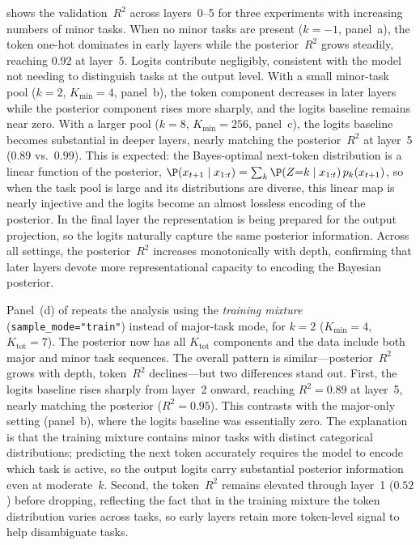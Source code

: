  shows the validation~$R^2$ across layers~0--5 for
three experiments with increasing numbers of minor tasks.
When no minor tasks are present ($k = -1$, panel~a), the token one-hot
dominates in early layers while the posterior~$R^2$ grows steadily, reaching
$0.92$ at layer~5.
Logits contribute negligibly, consistent with the model not needing to
distinguish tasks at the output level.
With a small minor-task pool ($k = 2$, $K_{\mathrm{min}} = 4$, panel~b),
the token component decreases in later layers while the posterior component
rises more sharply, and the logits baseline remains near zero.
With a larger pool ($k = 8$, $K_{\mathrm{min}} = 256$, panel~c), the logits
baseline becomes substantial in deeper layers, nearly matching the
posterior~$R^2$ at layer~5 ($0.89$ vs.\ $0.99$).
This is expected: the Bayes-optimal next-token distribution is a linear
function of the posterior,
$\P(x_{t+1} \mid x_{1:t}) = \sum_k \P(Z{=}k \mid x_{1:t})\, p_k(x_{t+1})$,
so when the task pool is large and its distributions are diverse, this linear
map is nearly injective and the logits become an almost lossless encoding of
the posterior.
In the final layer the representation is being prepared for the output
projection, so the logits naturally capture the same posterior information.
Across all settings, the posterior~$R^2$ increases monotonically with depth,
confirming that later layers devote more representational capacity to encoding
the Bayesian posterior.

Panel~(d) of  repeats the analysis using the
\emph{training mixture} (\texttt{sample\_mode="train"}) instead of major-task
mode, for $k = 2$ ($K_{\mathrm{min}} = 4$, $K_{\mathrm{tot}} = 7$).
The posterior now has all $K_{\mathrm{tot}}$ components and the data include
both major and minor task sequences.
The overall pattern is similar---posterior~$R^2$ grows with depth, token~$R^2$
declines---but two differences stand out.
First, the logits baseline rises sharply from layer~2 onward, reaching
$R^2 = 0.89$ at layer~5, nearly matching the posterior ($R^2 = 0.95$).
This contrasts with the major-only setting (panel~b), where the logits
baseline was essentially zero.
The explanation is that the training mixture contains minor tasks with distinct
categorical distributions; predicting the next token accurately requires the
model to encode which task is active, so the output logits carry substantial
posterior information even at moderate~$k$.
Second, the token~$R^2$ remains elevated through layer~1 ($0.52$) before
dropping, reflecting the fact that in the training mixture the token
distribution varies across tasks, so early layers retain more token-level
signal to help disambiguate tasks.

